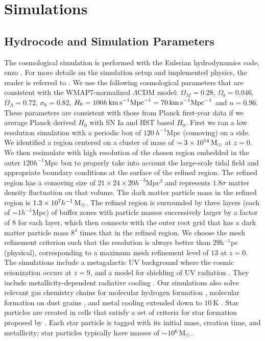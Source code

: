 \section{Simulations}\label{sec: sims}

\subsection{Hydrocode and Simulation Parameters}

The cosmological simulation is performed with the Eulerian hydrodynamics code, {\sc enzo} \citep[][]{1999aBryan, 2005OShea, 2009Joung}.
For more details on the simulation setup and implemented physics, the reader is referred to \citet[][]{2012Cen}.
We use the following cosmological parameters that are consistent with 
the WMAP7-normalized \citep[][]{2010Komatsu} $\Lambda$CDM model:
$\Omega_M=0.28$, $\Omega_b=0.046$, $\Omega_{\Lambda}=0.72$, $\sigma_8=0.82$,
$H_0=100 h \,{\rm km\, s}^{-1} {\rm Mpc}^{-1} = 70 \,{\rm km\, s}^{-1} {\rm Mpc}^{-1}$ and $n=0.96$.
These parameters are consistent with those from Planck first-year data \citep[][]{2013Planck}
if we average Planck derived $H_0$ with SN Ia and HST based $H_0$.
First we ran a low resolution simulation with a periodic box of $120~h^{-1}$Mpc 
(comoving) on a side.
We identified a region centered on a cluster of mass of $\sim 3\times 10^{14}{\rm\,M_\odot}$ at $z=0$.
We then resimulate with high resolution of the chosen region embedded
in the outer $120h^{-1}$Mpc box to properly take into account the large-scale tidal field
and appropriate boundary conditions at the surface of the refined region.
The refined region %
has a comoving size of $21\times 24\times 20h^{-3}$Mpc$^3$ 
and represents $1.8\sigma$ matter density fluctuation on that volume.
The dark matter particle mass in the refined region is $1.3\times 10^7h^{-1}{\rm\,M_\odot}$.
The refined region is surrounded by three layers (each of $\sim 1h^{-1}$Mpc) of buffer zones with 
particle masses successively larger by a factor of $8$ for each layer, 
which then connects with
the outer root grid that has a dark matter particle mass $8^4$ times that in the refined region.
We choose the mesh refinement criterion such that the resolution is 
always better than $29$h$^{-1}$pc (physical), corresponding to a maximum mesh refinement level of $13$ at $z=0$.
The simulations include
a metagalactic UV background
\citep[][]{1996Haardt} where the cosmic reionization occurs at $z=9$,
and a model for shielding of UV radiation \citep[][]{2005Cen}.
They include metallicity-dependent radiative cooling \citep[][]{1995Cen}.
Our simulations also solve relevant gas chemistry
chains for molecular hydrogen formation \citep[][]{1997Abel},
molecular formation on dust grains \citep[][]{2009Joung},
and metal cooling extended down to $10~$K \citep[][]{1972Dalgarno}.
Star particles are created in cells that satisfy a set of criteria for 
star formation proposed by \citet[][]{1992CenOstriker}.
Each star particle is tagged with its initial mass, creation time, and metallicity; 
star particles typically have masses of $\sim$$10^6{\rm\,M_\odot}$.

